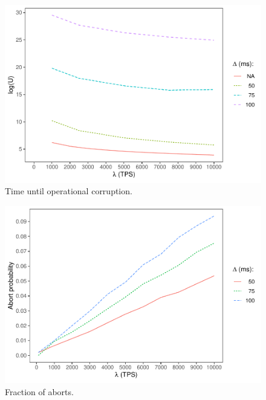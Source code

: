 \begin{figure}[htbp]
  \centering
  \includegraphics[width=\linewidth]{./figures/delta}
  \caption{Time until operational corruption.}
  \label{time-to-corruption-results}
\end{figure}

\begin{figure}[htbp]
  \centering
  \includegraphics[width=\linewidth]{./figures/aborts}
  \caption{Fraction of aborts.}
  \label{aborts-results}
\end{figure}
